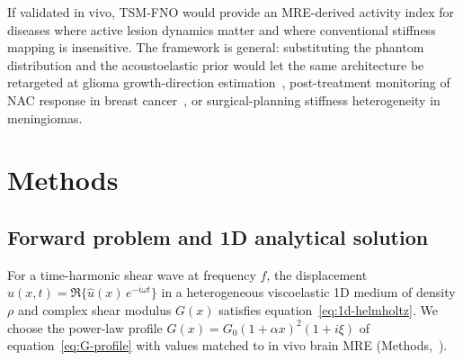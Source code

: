 \documentclass[11pt,letterpaper]{article}
\begin{document}
If validated in vivo, TSM-FNO would provide an MRE-derived activity index
for diseases where active lesion dynamics matter and where conventional
stiffness mapping is insensitive. The framework is general: substituting
the phantom distribution and the acoustoelastic prior would let the same
architecture be retargeted at glioma growth-direction
estimation~\cite{he2025glioma}, post-treatment monitoring of NAC response
in breast cancer~\cite{sinha2025breast}, or surgical-planning stiffness
heterogeneity in meningiomas.

\section*{Methods}
\label{sec:methods}

\subsection*{Forward problem and 1D analytical solution}
\label{sec:methods-1d}

For a time-harmonic shear wave at frequency $f$, the displacement
$u(x,t)=\Re\{\hat u(x)\,e^{-i\omega t}\}$ in a heterogeneous viscoelastic
1D medium of density $\rho$ and complex shear modulus $G(x)$ satisfies
equation~\eqref{eq:1d-helmholtz}. We choose the power-law profile
$G(x) = G_{0}(1+\alpha x)^{2}(1+i\xi)$ of
equation~\eqref{eq:G-profile} with values matched to in vivo brain MRE
(Methods,~).
\end{document}
